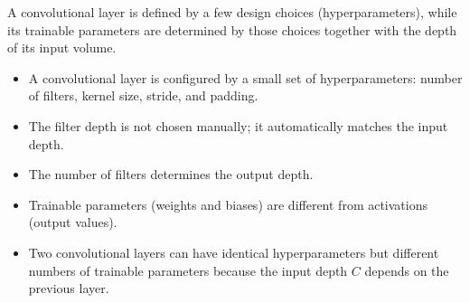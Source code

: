 \highspace
\begin{takeawaysbox}
    A convolutional layer is defined by a few design choices (hyperparameters), while its trainable parameters are determined by those choices together with the depth of its input volume.
    \begin{itemize}
        \item A convolutional layer is configured by a small set of hyperparameters: number of filters, kernel size, stride, and padding.
        \item The filter depth is not chosen manually; it automatically matches the input depth.
        \item The number of filters determines the output depth.
        \item Trainable parameters (weights and biases) are different from activations (output values).
        \item Two convolutional layers can have identical hyperparameters but different numbers of trainable parameters because the input depth $C$ depends on the previous layer.
    \end{itemize}
\end{takeawaysbox}